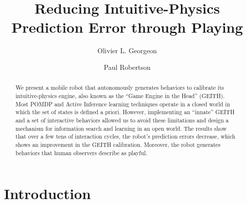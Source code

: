 \documentclass[runningheads]{llncs}
\begin{document}
%
\title{Reducing Intuitive-Physics Prediction Error through Playing}
%
%
\author{Olivier L. Georgeon \and
Paul Robertson }
%
%
%
\maketitle              %
%
\begin{abstract}
We present a mobile robot that autonomously generates behaviors to calibrate its intuitive-physics engine, also known as the ``Game Engine in the Head'' (GEITH).
Most POMDP and Active Inference learning techniques operate in a closed world in which the set of states is defined a priori. 
However, implementing an ``innate'' GEITH and a set of interactive behaviors allowed us to avoid these limitations and design a mechanism for information search and learning in an open world. 
The results show that over a few tens of interaction cycles, the robot's prediction errors decrease, which shows an improvement in the GEITH calibration. 
Moreover, the robot generates behaviors that human observers describe as playful.

\end{abstract}
%
%
%
\section{Introduction}
\label{sec:intro}
\end{document}
